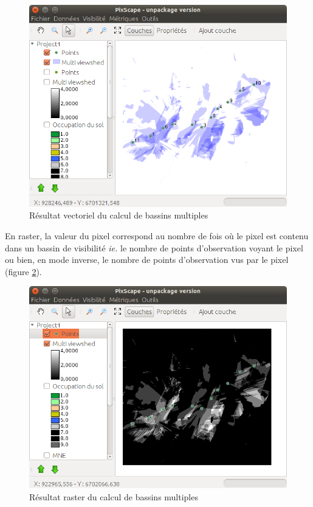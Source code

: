 \documentclass{report}
\begin{document}
\begin{figure}[H]
	\includegraphics[scale=0.5]{img/multi_viewshed_vector-fr.png} 
	\caption{Résultat vectoriel du calcul de bassins multiples}
	\label{multi_viewshed_vector}
\end{figure}

En raster, la valeur du pixel correspond au nombre de fois où le pixel est contenu dans un bassin de visibilité \textit{ie.} le nombre de points d'observation voyant le pixel ou bien, en mode inverse, le nombre de points d'observation vus par le pixel (figure \ref{multi_viewshed_raster}).

\begin{figure}[H]
	\includegraphics[scale=0.5]{img/multi_viewshed_raster-fr.png} 
	\caption{Résultat raster du calcul de bassins multiples}
	\label{multi_viewshed_raster}
\end{figure}
\end{document}
